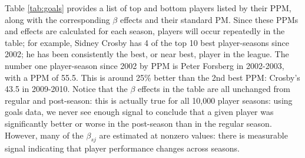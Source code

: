 Table \ref{tab:goals} provides a
list of top and bottom players listed by their PPM, along with the
corresponding $\beta$ effects and their standard PM.  Since these PPMs and
effects are calculated for each season, players will occur repeatedly in the
table; for example, Sidney Crosby has 4 of the top 10 best player-seasons
since 2002; he has been consistently the best, or near best, player in the
league.  The number one player-season since 2002 by PPM is Peter Forsberg in 2002-2003,
with a PPM of 55.5.  This is around 25\% better than the 2nd best PPM:
Crosby's 43.5 in 2009-2010.  Notice that the $\beta$ effects in the table are
all unchanged from regular and post-season: this is actually true for all
10,000 player seasons: using goals data, we never see enough signal to conclude
that a given player was significantly better or worse in the post-season than
in the regular season.  However, many of the $\beta_{sj}$ are estimated at
nonzero values: there is measurable signal indicating that player performance
changes across seasons.


